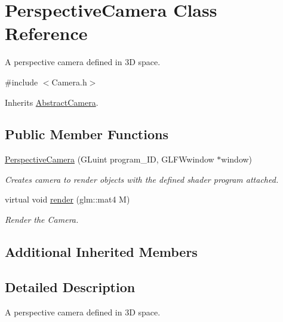 \hypertarget{class_perspective_camera}{\section{Perspective\-Camera Class Reference}
\label{class_perspective_camera}
}


A perspective camera defined in 3\-D space.  




{\ttfamily \#include $<$Camera.\-h$>$}



Inherits \hyperlink{class_abstract_camera}{Abstract\-Camera}.

\subsection*{Public Member Functions}
\begin{DoxyCompactItemize}
\item 
\hyperlink{class_perspective_camera_a9f0290f56bac8233e13424e7ee16c86a}{Perspective\-Camera} (G\-Luint program\-\_\-\-I\-D, G\-L\-F\-Wwindow $\ast$window)
\begin{DoxyCompactList}\small\item\em Creates camera to render objects with the defined shader program attached. \end{DoxyCompactList}\item 
virtual void \hyperlink{class_perspective_camera_a3d66d01e63fdfa73c474ae622baf7036}{render} (glm\-::mat4 M)
\begin{DoxyCompactList}\small\item\em Render the Camera. \end{DoxyCompactList}\end{DoxyCompactItemize}
\subsection*{Additional Inherited Members}


\subsection{Detailed Description}
A perspective camera defined in 3\-D space. 

